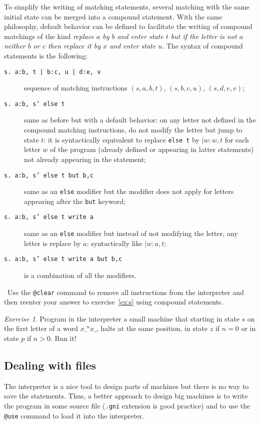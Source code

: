 \documentclass[a4paper,11pt]{article}
\theoremstyle{remark}
\newtheorem{exercise}{Exercise}
\newcommand\doit[1]{\medskip\par\noindent\ding{229}~\textsf{#1}}
\begin{document}
To simplify the writing of matching statements, several matching with the same initial state can
be merged into a compound statement. With the same philosophy, default behavior can be defined to
facilitate the writing of compound matchings of the kind \emph{replace $a$ by $b$ and enter state $t$
but if the letter is not $a$ neither $b$ or $c$ then replace it by $x$ and enter state $u$}.
The syntax of compound statements is the following:
\begin{description}
	\item[\texttt{s.~a:b, t | b:c, u | d:e, v}] sequence of matching instructions $(s,a,b,t)$, 
	$(s,b,c,u)$, $(s,d,e,v)$;
	\item[\texttt{s.~a:b, s' else t}] same as before but with a default behavior: on any letter
	not defined in the compound matching instructions, do not modify the letter but jump to state $t$:
	it is syntactically equivalent to replace \texttt{else t} by $| w:w, t$ for each letter $w$ of
	the program (already defined or appearing in latter statements) not already appearing in the
	statement;
	\item[\texttt{s.~a:b, s' else t but b,c}] same as an \texttt{else} modifier but the modifier
	does not apply for letters appearing after the \texttt{but} keyword;
	\item[\texttt{s.~a:b, s' else t write a}] same as an \texttt{else} modifier but instead of
	not modifying the letter, any letter is replace by $a$: syntactically like $| w:a, t$;
	\item[\texttt{s.~a:b, s' else t write a but b,c}] is a combination of all the modifiers.
\end{description}

\doit{Use the \texttt{@clear} command to remove all instructions from the interpreter
and then reenter your answer to exercise~\ref{ex:s} using compound statements.}

\begin{exercise}\label{ex:p}
Program in the interpreter a small machine that starting in state $s$ on the first letter of
a word $x{\_}^{n}x\_$, halts at the same position, in state $z$ if $n=0$ or in state $p$ if
$n>0$. Run it!
\end{exercise}

\subsection{Dealing with files}

The interpreter is a nice tool to design parts of machines but there is no way to save
the statements. Thus, a better approach to design big machines is to write the program
in some source file (\texttt{.gni} extension is good practice) and to use the \texttt{@use}
command to load it into the interpreter.
\end{document}
